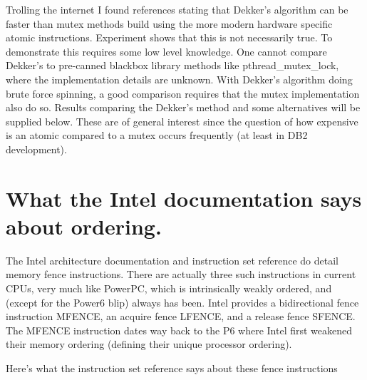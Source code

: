 Trolling the internet I found references stating that Dekker's algorithm can be faster than mutex methods build using the more modern hardware specific atomic instructions.  Experiment shows that this is not necessarily true.  To demonstrate this requires some low level knowledge.  One cannot compare Dekker's to pre-canned blackbox library methods like pthread\_mutex\_lock, where the implementation details are unknown.  With Dekker's algorithm doing brute force spinning, a good comparison requires that the mutex implementation also do so.  Results comparing the Dekker's method and some alternatives will be supplied below.  These are of general interest since the question of how expensive is an atomic compared to a mutex occurs frequently (at least in DB2 development).

\section{What the Intel documentation says about ordering.}

The Intel architecture documentation and instruction set reference do detail memory fence instructions.  There are actually three such instructions in current CPUs, very much like PowerPC, which is intrinsically weakly ordered, and (except for the Power6 blip) always has been.  Intel provides a bidirectional fence instruction MFENCE, an acquire fence LFENCE, and a release fence SFENCE.  The MFENCE instruction dates way back to the P6 where Intel first weakened their memory ordering (defining their unique processor ordering).

Here's what the instruction set reference says about these fence instructions

